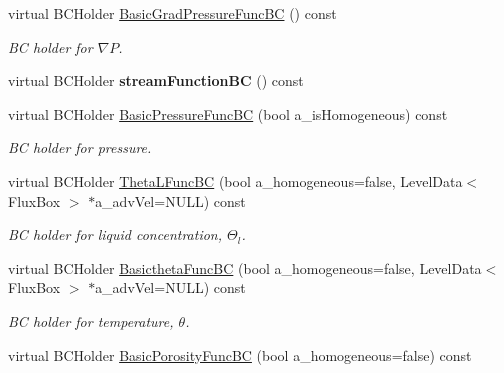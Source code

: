 \begin{DoxyCompactItemize}
virtual B\-C\-Holder \hyperlink{class_phys_b_c_util_a322ff42e655dd2a77b73e77f6b413159}{Basic\-Grad\-Pressure\-Func\-B\-C} () const 
\begin{DoxyCompactList}\small\item\em B\-C holder for $ \nabla P $. \end{DoxyCompactList}\item 
\hypertarget{class_phys_b_c_util_ad8f25c0af3d3b453a0d419cf0520349c}{virtual B\-C\-Holder {\bfseries stream\-Function\-B\-C} () const }\label{class_phys_b_c_util_ad8f25c0af3d3b453a0d419cf0520349c}

\item 
virtual B\-C\-Holder \hyperlink{class_phys_b_c_util_aadb095de5dc8347b10e0109c7754e764}{Basic\-Pressure\-Func\-B\-C} (bool a\-\_\-is\-Homogeneous) const 
\begin{DoxyCompactList}\small\item\em B\-C holder for pressure. \end{DoxyCompactList}\item 
\hypertarget{class_phys_b_c_util_aae91468f5b33eb3a2a52a3fc5af54d35}{virtual B\-C\-Holder \hyperlink{class_phys_b_c_util_aae91468f5b33eb3a2a52a3fc5af54d35}{Theta\-L\-Func\-B\-C} (bool a\-\_\-homogeneous=false, Level\-Data$<$ Flux\-Box $>$ $\ast$a\-\_\-adv\-Vel=N\-U\-L\-L) const }\label{class_phys_b_c_util_aae91468f5b33eb3a2a52a3fc5af54d35}

\begin{DoxyCompactList}\small\item\em B\-C holder for liquid concentration, $ \Theta_l $. \end{DoxyCompactList}\item 
\hypertarget{class_phys_b_c_util_ac73090123aca05c7b468f7d54cf85f92}{virtual B\-C\-Holder \hyperlink{class_phys_b_c_util_ac73090123aca05c7b468f7d54cf85f92}{Basictheta\-Func\-B\-C} (bool a\-\_\-homogeneous=false, Level\-Data$<$ Flux\-Box $>$ $\ast$a\-\_\-adv\-Vel=N\-U\-L\-L) const }\label{class_phys_b_c_util_ac73090123aca05c7b468f7d54cf85f92}

\begin{DoxyCompactList}\small\item\em B\-C holder for temperature, $ \theta $. \end{DoxyCompactList}\item 
\hypertarget{class_phys_b_c_util_a2508fcbc784f47bb77a38ed106a62fe2}{virtual B\-C\-Holder \hyperlink{class_phys_b_c_util_a2508fcbc784f47bb77a38ed106a62fe2}{Basic\-Porosity\-Func\-B\-C} (bool a\-\_\-homogeneous=false) const }\label{class_phys_b_c_util_a2508fcbc784f47bb77a38ed106a62fe2}


\end{DoxyCompactItemize}
